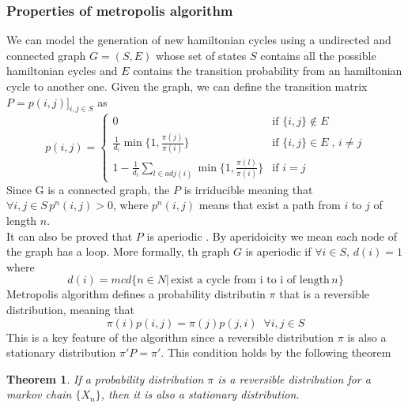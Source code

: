 \documentclass{article}
\newtheorem{theorem}{Theorem}
\begin{document}
\subsubsection{Properties of metropolis algorithm}
We can model the generation of new hamiltonian cycles using a undirected and connected graph $G = (S,E)$ whose set of states $S$ contains all the possible hamiltonian cycles and $E$ contains the transition probability from an hamiltonian cycle to another one. Given the graph, we can define the transition matrix $P=p(i,j)]_{i,j\in S}$ as
\begin{equation}
p(i,j) =  \begin{cases} 
	0\, & \mbox{if } \{i,j\} \notin E  \\ 
	\frac{1}{d_i} \min\{1,\frac{\pi(j)}{\pi(i)}\} & \mbox{if }  \{i,j\} \in E \;,\, i \neq j\\
	1-\frac{1}{d_i} \sum_{l \in adj(i)} \min\{1,\frac{\pi(l)}{\pi(i)}\}  & \mbox{if }  i = j 
\end{cases}
\end{equation}
Since G is a connected graph, the $P$ is irriducible meaning that $\forall i,j \in S \, p^n(i,j) > 0$, where $p^n(i,j)$ means that exist a path from $i$ to $j$ of length $n$.\\
It can also be proved that $P$ is aperiodic \cite{metropolis}. By aperidoicity we mean each node of the graph has a loop. More formally, th graph $G$ is aperiodic if $\forall i \in S, \,d(i)  = 1$ where
\begin{equation}
d(i) = mcd \{n \in N | \, \text{exist a cycle from i to i of length} \, n\}
\end{equation}
Metropolis algorithm defines a probability distributin $\pi$ that is a reversible distribution, meaning that
\begin{equation}
	\pi(i)p(i,j) = \pi(j)p(j,i) \;\; \forall i,j \in S
\end{equation}
This is a key feature of the algorithm since a reversible distribution $\pi$ is also a stationary distribution $\pi'P=\pi'$. This condition holds by the following theorem
\begin{theorem}
If a probability distribution $\pi$ is a reversible distribution for a markov chain $ \{X_n\} $, then it is also a stationary distribution.
\end{theorem}
\end{document}
